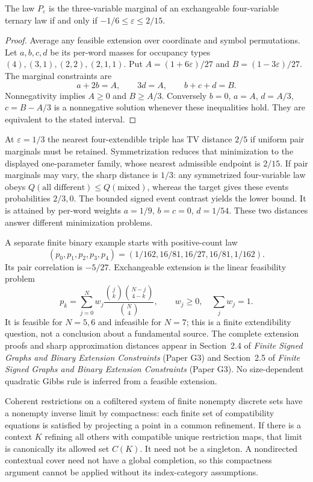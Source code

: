 \begin{proposition}
The law $P_\varepsilon$ is the three-variable marginal of an exchangeable four-variable ternary law if and only if $-1/6\le\varepsilon\le2/15$.
\end{proposition}
\begin{proof}
Average any feasible extension over coordinate and symbol permutations. Let $a,b,c,d$ be its per-word masses for occupancy types $(4),(3,1),(2,2),(2,1,1)$. Put $A=(1+6\varepsilon)/27$ and $B=(1-3\varepsilon)/27$. The marginal constraints are
\[
 a+2b=A,\qquad3d=A,\qquad b+c+d=B.
\]
Nonnegativity implies $A\ge0$ and $B\ge A/3$. Conversely $b=0$, $a=A$, $d=A/3$, $c=B-A/3$ is a nonnegative solution whenever these inequalities hold. They are equivalent to the stated interval.
\end{proof}
At $\varepsilon=1/3$ the nearest four-extendible triple has TV distance $2/5$ if uniform pair marginals must be retained. Symmetrization reduces that minimization to the displayed one-parameter family, whose nearest admissible endpoint is $2/15$. If pair marginals may vary, the sharp distance is $1/3$: any symmetrized four-variable law obeys $Q(\text{all different})\le Q(\text{mixed})$, whereas the target gives these events probabilities $2/3,0$. The bounded signed event contrast yields the lower bound. It is attained by per-word weights $a=1/9$, $b=c=0$, $d=1/54$. These two distances answer different minimization problems.

A separate finite binary example starts with positive-count law
\[
 (p_0,p_1,p_2,p_3,p_4)=(1/162,16/81,16/27,16/81,1/162).
\]
Its pair correlation is $-5/27$. Exchangeable extension is the linear feasibility problem
\[
 p_k=\sum_{j=0}^N w_j\frac{\binom jk\binom{N-j}{4-k}}{\binom N4},
 \qquad w_j\ge0,\quad\sum_jw_j=1.
\]
It is feasible for $N=5,6$ and infeasible for $N=7$; this is a finite extendibility question, not a conclusion about a fundamental source. The complete extension proofs and sharp approximation distances appear in Section~2.4 of \emph{Finite Signed Graphs and Binary Extension Constraints} (Paper G3) and Section~2.5 of \emph{Finite Signed Graphs and Binary Extension Constraints} (Paper G3). No size-dependent quadratic Gibbs rule is inferred from a feasible extension.

Coherent restrictions on a cofiltered system of finite nonempty discrete sets have a nonempty inverse limit by compactness: each finite set of compatibility equations is satisfied by projecting a point in a common refinement. If there is a context $K$ refining all others with compatible unique restriction maps, that limit is canonically its allowed set $C(K)$. It need not be a singleton. A nondirected contextual cover need not have a global completion, so this compactness argument cannot be applied without its index-category assumptions.

